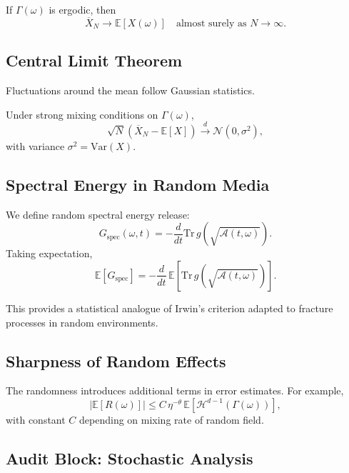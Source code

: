 \begin{theorem}
\label{thm:LLN-trace}
If $\Gamma(\omega)$ is ergodic, then
\[
\overline{X}_N \to \mathbb{E}[X(\omega)] \quad \text{almost surely as } N\to\infty.
\]
\end{theorem}

\subsection{Central Limit Theorem}

Fluctuations around the mean follow Gaussian statistics.

\begin{theorem}
\label{thm:CLT-trace}
Under strong mixing conditions on $\Gamma(\omega)$,
\[
\sqrt{N}\left(\overline{X}_N - \mathbb{E}[X]\right) \xrightarrow{d} \mathcal{N}(0,\sigma^2),
\]
with variance $\sigma^2 = \mathrm{Var}(X)$.
\end{theorem}

\subsection{Spectral Energy in Random Media}

We define random spectral energy release:
\[
G_{\text{spec}}(\omega,t) = -\frac{d}{dt}\mathrm{Tr}\, g(\sqrt{\mathcal{A}(t,\omega)}).
\]
Taking expectation,
\[
\mathbb{E}[G_{\text{spec}}] = -\frac{d}{dt}\,\mathbb{E}[\mathrm{Tr}\, g(\sqrt{\mathcal{A}(t,\omega)})].
\]

This provides a statistical analogue of Irwin’s criterion adapted to
fracture processes in random environments.

\subsection{Sharpness of Random Effects}

The randomness introduces additional terms in error estimates.  
For example,
\[
|\mathbb{E}[R(\omega)]| \leq C \, \eta^{-\theta} \, \mathbb{E}[\mathcal{H}^{d-1}(\Gamma(\omega))],
\]
with constant $C$ depending on mixing rate of random field.

\subsection{Audit Block: Stochastic Analysis}

